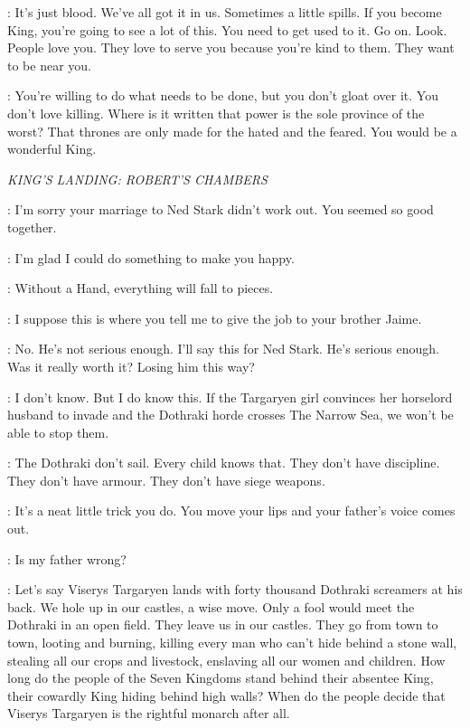 \LORAS: It's just blood. We've all got it in us. Sometimes a little spills. If you become King, you're going to see a lot of this. You need to get used to it. Go on. Look. People love you. They love to serve you because you're kind to them. They want to be near you. 


\LORAS: You're willing to do what needs to be done, but you don't gloat over it. You don't love killing. Where is it written that power is the sole province of the worst? That thrones are only made for the hated and the feared. You would be a wonderful King. 


\scene

\textit{KING'S LANDING: ROBERT'S CHAMBERS} 


\CERSEI: I'm sorry your marriage to Ned Stark didn't work out. You seemed so good together. 

\ROBERT: I'm glad I could do something to make you happy. 

\CERSEI: Without a Hand, everything will fall to pieces. 

\ROBERT: I suppose this is where you tell me to give the job to your brother Jaime. 

\CERSEI: No. He's not serious enough. I'll say this for Ned Stark.  He's serious enough. Was it really worth it? Losing him this way? 

\ROBERT: I don't know. But I do know this.  If the Targaryen girl convinces her horselord husband to invade and the Dothraki horde crosses The Narrow Sea, we won't be able to stop them. 

\CERSEI: The Dothraki don't sail. Every child knows that. They don't have discipline. They don't have armour. They don't have siege weapons. 

\ROBERT: It's a neat little trick you do.  You move your lips and your father's voice comes out. 

\CERSEI: Is my father wrong? 

\ROBERT: Let's say Viserys Targaryen lands with forty thousand Dothraki screamers at his back. We hole up in our castles, a wise move. Only a fool would meet the Dothraki in an open field. They leave us in our castles. They go from town to town, looting and burning, killing every man who can't hide behind a stone wall, stealing all our crops and livestock, enslaving all our women and children. How long do the people of the Seven Kingdoms stand behind their absentee King, their cowardly King hiding behind high walls? When do the people decide that Viserys Targaryen is the rightful monarch after all. 

